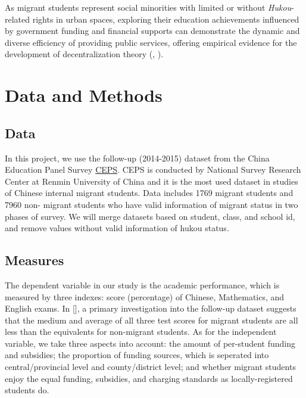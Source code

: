 \documentclass[
  man,
  floatsintext,
  longtable,
  nolmodern,
  notxfonts,
  notimes,
  colorlinks=true,linkcolor=blue,citecolor=blue,urlcolor=blue]{apa7}
\begin{document}
As migrant students represent social minorities with limited or without
\emph{Hukou}-related rights in urban spaces, exploring their education
achievements influenced by government funding and financial supports can
demonstrate the dynamic and diverse efficiency of providing public
services, offering empirical evidence for the development of
decentralization theory
(,
).

\section{Data and Methods}\label{data-and-methods}

\subsection{Data}\label{data}

In this project, we use the follow-up (2014-2015) dataset from the China
Education Panel Survey
\href{http://ceps.ruc.edu.cn/English/Home.htm}{CEPS}. CEPS is conducted
by National Survey Research Center at Renmin University of China and it
is the most used dataset in studies of Chinese internal migrant
students. Data includes 1769 migrant students and 7960 non- migrant
students who have valid information of migrant status in two phases of
survey. We will merge datasets based on student, class, and school id,
and remove values without valid information of hukou status.

\subsection{Measures}\label{measures}

The dependent variable in our study is the academic performance, which
is measured by three indexes: score (percentage) of Chinese,
Mathematics, and English exams. In {[}{]}, a primary investigation into
the follow-up dataset suggests that the medium and average of all three
test scores for migrant students are all less than the equivalents for
non-migrant students. As for the independent variable, we take three
aspects into account: the amount of per-student funding and subsidies;
the proportion of funding sources, which is seperated into
central/provincial level and county/district level; and whether migrant
students enjoy the equal funding, subsidies, and charging standards as
locally-registered students do.
\end{document}
